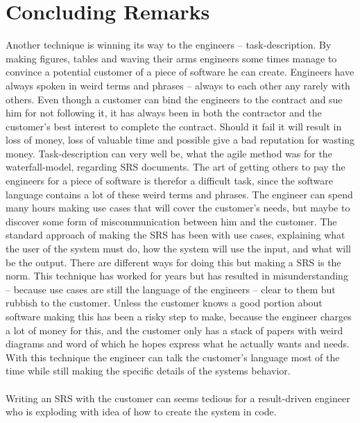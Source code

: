 \documentclass[Main]{subfiles}
\begin{document}

\section{Concluding Remarks}
Another technique is winning its way to the engineers -- task-description.
By making figures, tables and waving their arms engineers some times manage to convince a potential customer of a piece of software he can create.
Engineers have always spoken in weird terms and phrases -- always to each other any rarely with others.
Even though a customer can bind the engineers to the contract and sue him for not following it, it has always been in both the contractor and the customer's best interest to complete the contract.
Should it fail it will result in loss of money, loss of valuable time and possible give a bad reputation for wasting money.
Task-description can very well be, what the agile method was for the waterfall-model, regarding SRS documents.
The art of getting others to pay the engineers for a piece of software is therefor a difficult task, since the software language contains a lot of these weird terms and phrases.
The engineer can spend many hours making use cases that will cover the customer's needs, but maybe to discover some form of miscommunication between him and the customer.
The standard approach of making the SRS has been with use cases, explaining what the user of the system must do, how the system will use the input, and what will be the output.
There are different ways for doing this but making a SRS is the norm.
This technique has worked for years but has resulted in misunderstanding -- because use cases are still the language of the engineers -- clear to them but rubbish to the customer.
Unless the customer knows a good portion about software making this has been a risky step to make, because the engineer charges a lot of money for this, and the customer only has a stack of papers with weird diagrams and word of which he hopes express what he actually wants and needs.
With this technique the engineer can talk the customer's language most of the time while still making the specific details of the systems behavior.
\\
\\
Writing an SRS with the customer can seems tedious for a result-driven engineer who is exploding with idea of how to create the system in code.
\end{document}
